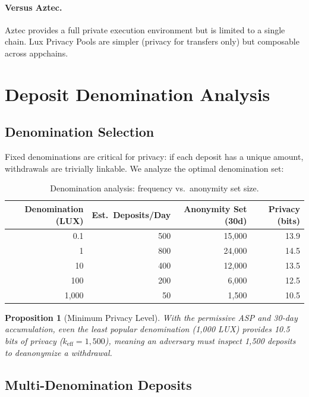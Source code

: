 \documentclass[11pt,a4paper]{article}
\newtheorem{proposition}[theorem]{Proposition}
\begin{document}
\paragraph{Versus Aztec.} Aztec provides a full private execution environment but is limited to a single chain. Lux Privacy Pools are simpler (privacy for transfers only) but composable across appchains.

\section{Deposit Denomination Analysis}\label{sec:denominations}

\subsection{Denomination Selection}

Fixed denominations are critical for privacy: if each deposit has a unique amount, withdrawals are trivially linkable. We analyze the optimal denomination set:

\begin{table}[H]
\centering
\caption{Denomination analysis: frequency vs.\ anonymity set size.}
\label{tab:denominations}
\begin{tabular}{rrrr}
\toprule
\textbf{Denomination (LUX)} & \textbf{Est.\ Deposits/Day} & \textbf{Anonymity Set (30d)} & \textbf{Privacy (bits)} \\
\midrule
0.1 & 500 & 15,000 & 13.9 \\
1 & 800 & 24,000 & 14.5 \\
10 & 400 & 12,000 & 13.5 \\
100 & 200 & 6,000 & 12.5 \\
1,000 & 50 & 1,500 & 10.5 \\
\bottomrule
\end{tabular}
\end{table}

\begin{proposition}[Minimum Privacy Level]
With the permissive ASP and 30-day accumulation, even the least popular denomination (1,000 LUX) provides 10.5 bits of privacy ($k_{\text{eff}} = 1{,}500$), meaning an adversary must inspect 1,500 deposits to deanonymize a withdrawal.
\end{proposition}

\subsection{Multi-Denomination Deposits}
\end{document}
